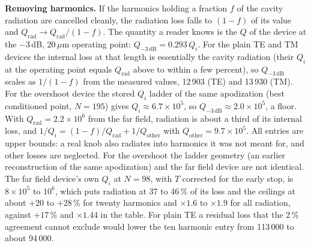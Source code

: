 \documentclass[11pt]{article}
\begin{document}
\textbf{Removing harmonics.} If the harmonics holding a fraction $f$ of the cavity radiation are cancelled cleanly, the radiation loss falls to $(1-f)$ of its value and $Q_\mathrm{rad}\to Q_\mathrm{rad}/(1-f)$. The quantity a reader knows is the $Q$ of the device at the $-3$\,dB, 20\,$\mu$m operating point: $Q_{-3\,\mathrm{dB}}=0.293\,Q_i$. For the plain TE and TM devices the internal loss at that length is essentially the cavity radiation (their $Q_i$ at the operating point equals $Q_\mathrm{rad}$ above to within a few percent), so $Q_{-3\,\mathrm{dB}}$ scales as $1/(1-f)$ from the measured values, 12\,903 (TE) and 13\,930 (TM). For the overshoot device the stored $Q_i$ ladder of the same apodization (best conditioned point, $N=195$) gives $Q_i\approx6.7\times10^5$, so $Q_{-3\,\mathrm{dB}}\approx2.0\times10^5$, a floor. With $Q_\mathrm{rad}=2.2\times10^6$ from the far field, radiation is about a third of its internal loss, and $1/Q_i=(1-f)/Q_\mathrm{rad}+1/Q_\mathrm{other}$ with $Q_\mathrm{other}=9.7\times10^5$. All entries are upper bounds: a real knob also radiates into harmonics it was not meant for, and other losses are neglected. For the overshoot the ladder geometry (an earlier reconstruction of the same apodization) and the far field device are not identical. The far field device's own $Q_i$ at $N=98$, with $T$ corrected for the early stop, is $8\times10^5$ to $10^6$, which puts radiation at 37 to 46\,\% of its loss and the ceilings at about $+20$ to $+28$\,\% for twenty harmonics and $\times1.6$ to $\times1.9$ for all radiation, against $+17$\,\% and $\times1.44$ in the table. For plain TE a residual loss that the 2\,\% agreement cannot exclude would lower the ten harmonic entry from 113\,000 to about 94\,000.
\end{document}
